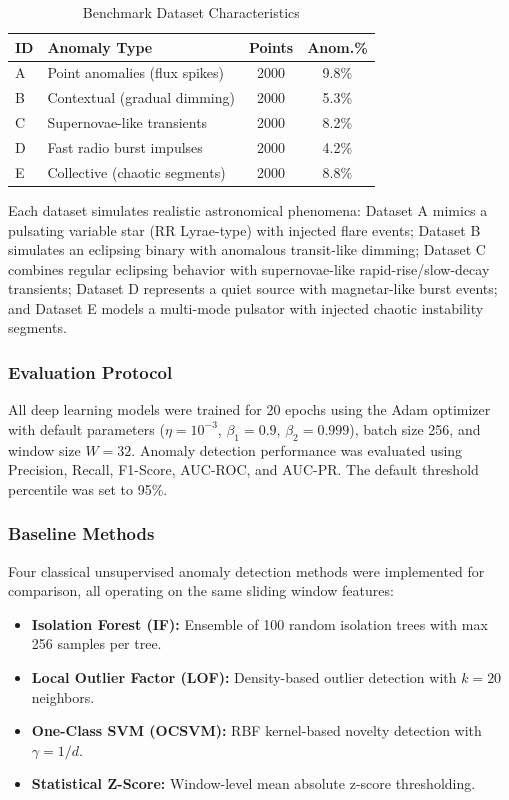 \documentclass[conference]{IEEEtran}
\begin{document}
\begin{table}[htbp]
\caption{Benchmark Dataset Characteristics}
\begin{center}
\begin{tabular}{|l|l|c|c|}
\hline
\textbf{ID} & \textbf{Anomaly Type} & \textbf{Points} & \textbf{Anom.\%} \\
\hline
A & Point anomalies (flux spikes) & 2000 & 9.8\% \\
B & Contextual (gradual dimming) & 2000 & 5.3\% \\
C & Supernovae-like transients & 2000 & 8.2\% \\
D & Fast radio burst impulses & 2000 & 4.2\% \\
E & Collective (chaotic segments) & 2000 & 8.8\% \\
\hline
\end{tabular}
\label{tab:datasets}
\end{center}
\end{table}

Each dataset simulates realistic astronomical phenomena: Dataset A mimics a pulsating variable star (RR Lyrae-type) with injected flare events; Dataset B simulates an eclipsing binary with anomalous transit-like dimming; Dataset C combines regular eclipsing behavior with supernovae-like rapid-rise/slow-decay transients; Dataset D represents a quiet source with magnetar-like burst events; and Dataset E models a multi-mode pulsator with injected chaotic instability segments.

\subsubsection{Evaluation Protocol}
All deep learning models were trained for 20 epochs using the Adam optimizer~\cite{kingma2014adam} with default parameters ($\eta=10^{-3}$, $\beta_1=0.9$, $\beta_2=0.999$), batch size 256, and window size $W=32$. Anomaly detection performance was evaluated using Precision, Recall, F1-Score, AUC-ROC, and AUC-PR. The default threshold percentile was set to 95\%.

\subsubsection{Baseline Methods}
Four classical unsupervised anomaly detection methods were implemented for comparison, all operating on the same sliding window features:
\begin{itemize}
    \item \textbf{Isolation Forest (IF):} Ensemble of 100 random isolation trees with max 256 samples per tree.
    \item \textbf{Local Outlier Factor (LOF):} Density-based outlier detection with $k=20$ neighbors.
    \item \textbf{One-Class SVM (OCSVM):} RBF kernel-based novelty detection with $\gamma = 1/d$.
    \item \textbf{Statistical Z-Score:} Window-level mean absolute z-score thresholding.
\end{itemize}
\end{document}
